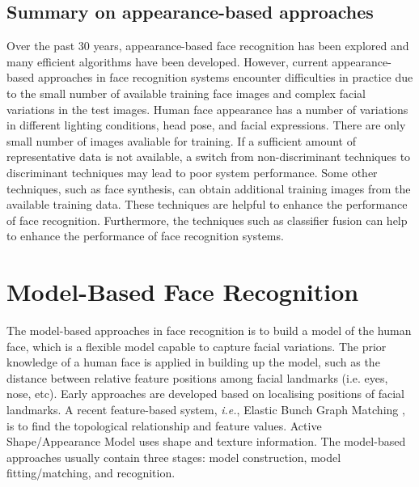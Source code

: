 \subsection{Summary on appearance-based approaches}
Over the past $30$ years, appearance-based face recognition has been explored and many efficient algorithms have been developed. However, current appearance-based approaches in face recognition systems encounter difficulties in practice due to the small number of available training face images and complex facial variations in the test images. Human face appearance has a number of variations in different lighting conditions, head pose, and facial expressions. There are only small number of images avaliable for training. If a sufficient amount of representative data is not available, a switch \cite{Martinez2001} from non-discriminant techniques to discriminant techniques may lead to poor system performance. Some other techniques, such as face synthesis, can obtain additional training images from the available training data. These techniques \cite{Zhao2000} are helpful to enhance the performance of face recognition. Furthermore, the techniques such as classifier fusion \cite{Lu2003fusion} can help to enhance the performance of face recognition systems.

\section{Model-Based Face Recognition}\label{sec:modelbased}
The model-based approaches in face recognition is to build a model of the human face, which is a flexible model capable to capture facial variations. The prior knowledge of a human face is applied in building up the model, such as the distance between relative feature positions among facial landmarks (i.e. eyes, nose, etc). Early approaches \cite{Galton1888,Bledsoe1964,Kelly1970,Kanade1977} are developed based on localising positions of facial landmarks. A recent feature-based system, \textit{i.e.}, Elastic Bunch Graph Matching \cite{Wiskott1997}, is to find the topological relationship and feature values. Active Shape/Appearance Model \cite{Cootes1996} uses shape and texture information. The model-based approaches usually contain three stages: model construction, model fitting/matching, and recognition.
